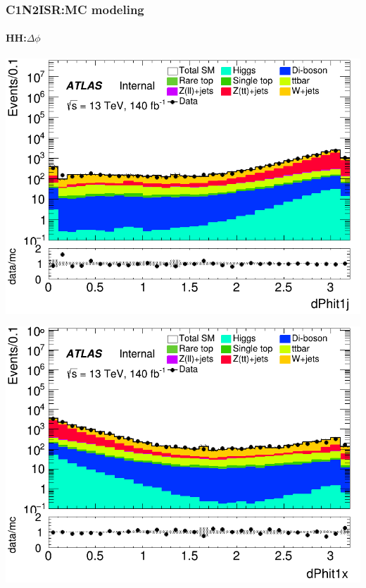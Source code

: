 \documentclass[usenames,dvipsnames]{beamer}
\begin{document}
\begin{frame}
\frametitle{C1N2ISR:MC modeling}
\framesubtitle{HH:\quad $\Delta\phi$}
    \begin{minipage}{0.32\textwidth}
        \centering
        \includegraphics[width=\textwidth]{graphics/HH_met/HH_met_dPhit1j.png}
    \end{minipage}
    \hfill
    \begin{minipage}{0.32\textwidth}
        \centering
        \includegraphics[width=\textwidth]{graphics/HH_met/HH_met_dPhit1x.png}
    \end{minipage}
    \hfill
    \begin{minipage}{0.32\textwidth}
        \centering

\end{minipage}
\end{frame}
\end{document}
